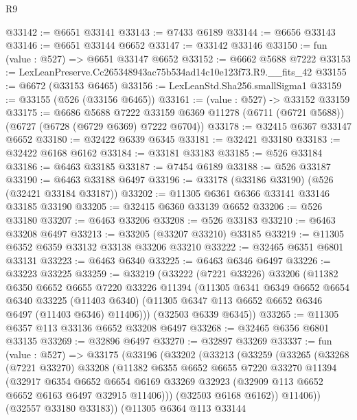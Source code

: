 \begin{lexlean}{R9}
\begin{coremodule}
@33142 := @6651 @33141
@33143 := @7433 @6189
@33144 := @6656 @33143
@33146 := @6651 @33144 @6652
@33147 := @33142 @33146
@33150 := fun (value : @527) => @6651 @33147 @6652
@33152 := @6662 @5688 @7222
@33153 := LexLeanPreserve.Cc265348943ac75b534ad14c10e123f73.R9.__fits_42
@33155 := @6672 (@33153 @6465)
@33156 := LexLeanStd.Sha256.smallSigma1
@33159 := @33155 (@526 (@33156 @6465))
@33161 := (value : @527) -> @33152 @33159
@33175 := @6686
    @5688
    @7222
    @33159
    @6369
    @11278
    (@6711 (@6721 @5688))
    (@6727 (@6728 (@6729 @6369) @7222 @6704))
@33178 := @32415 @6367 @33147 @6652
@33180 := @32422 @6339 @6345
@33181 := @32421 @33180
@33183 := @32422 @6168 @6162
@33184 := @33181 @33183
@33185 := @526 @33184
@33186 := @6463 @33185
@33187 := @7454 @6189
@33188 := @526 @33187
@33190 := @6463 @33188 @6497
@33196 := @33178 (@33186 @33190) (@526 (@32421 @33184 @33187))
@33202 := @11305 @6361 @6366 @33141 @33146 @33185 @33190
@33205 := @32415 @6360 @33139 @6652
@33206 := @526 @33180
@33207 := @6463 @33206
@33208 := @526 @33183
@33210 := @6463 @33208 @6497
@33213 := @33205 (@33207 @33210) @33185
@33219 := @11305 @6352 @6359 @33132 @33138 @33206 @33210
@33222 := @32465 @6351 @6801 @33131
@33223 := @6463 @6340
@33225 := @6463 @6346 @6497
@33226 := @33223 @33225
@33259 := @33219
    (@33222
      (@7221 @33226)
      @33206
      (@11382
        @6350
        @6652
        @6655
        @7220
        @33226
        @11394
        (@11305
          @6341
          @6349
          @6652
          @6654
          @6340
          @33225
          (@11403 @6340)
          (@11305 @6347 @113 @6652 @6652 @6346 @6497 (@11403 @6346) @11406)))
      (@32503 @6339 @6345))
@33265 := @11305 @6357 @113 @33136 @6652 @33208 @6497
@33268 := @32465 @6356 @6801 @33135
@33269 := @32896 @6497
@33270 := @32897 @33269
@33337 := fun (value : @527) =>
  @33175
    (@33196
      (@33202
        (@33213
          (@33259
            (@33265
              (@33268
                (@7221 @33270)
                @33208
                (@11382
                  @6355
                  @6652
                  @6655
                  @7220
                  @33270
                  @11394
                  (@32917
                    @6354
                    @6652
                    @6654
                    @6169
                    @33269
                    @32923
                    (@32909 @113 @6652 @6652 @6163 @6497 @32915 @11406)))
                (@32503 @6168 @6162))
              @11406))
          (@32557 @33180 @33183))
        (@11305
          @6364
          @113
          @33144

\end{coremodule}
\end{lexlean}
